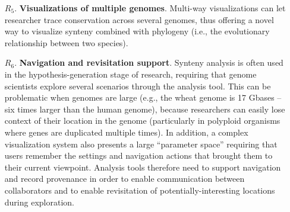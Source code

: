 \begin{enumerate}
\item [$R_5$.] \textbf{Visualizations of multiple genomes}. Multi-way visualizations can let researcher trace conservation across several genomes, thus offering a novel way to visualize synteny combined with phylogeny (i.e., the evolutionary relationship between two species).

\item [$R_6$.] \textbf{Navigation and revisitation support}. Synteny analysis is often used in the hypothesis-generation stage of research, requiring that genome scientists explore several scenarios through the analysis tool. This can be problematic when genomes are large (e.g., the wheat genome is 17 Gbases -- six times larger than the human genome), because researchers can easily lose context of their location in the genome (particularly in polyploid organisms where genes are duplicated multiple times). In addition, a complex visualization system also presents a large ``parameter space'' requiring that users remember the settings and navigation actions that brought them to their current viewpoint. Analysis tools therefore need to support navigation and record provenance in order to enable communication between collaborators and to enable revisitation of potentially-interesting locations during exploration.

\end{enumerate}
